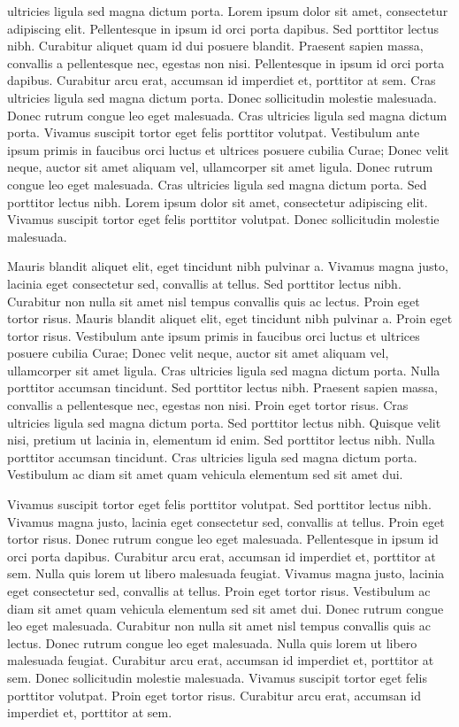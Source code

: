 \documentclass{article}
\begin{document}
\beginnumbering
\autopar
 ultricies ligula sed magna dictum porta. Lorem ipsum dolor sit amet, consectetur adipiscing elit. Pellentesque in ipsum id orci porta dapibus. Sed porttitor lectus nibh. Curabitur aliquet quam id dui posuere blandit. Praesent sapien massa, convallis a pellentesque nec, egestas non nisi. Pellentesque in ipsum id orci porta dapibus. Curabitur arcu erat, accumsan id imperdiet et, porttitor at sem. Cras ultricies ligula sed magna dictum porta. Donec sollicitudin molestie malesuada. Donec rutrum congue leo eget malesuada. Cras ultricies ligula sed magna dictum porta. Vivamus suscipit tortor eget felis porttitor volutpat. Vestibulum ante ipsum primis in faucibus orci luctus et ultrices posuere cubilia Curae; Donec velit neque, auctor sit amet aliquam vel, ullamcorper sit amet ligula. Donec rutrum congue leo eget malesuada. Cras ultricies ligula sed magna dictum porta. Sed porttitor lectus nibh. Lorem ipsum dolor sit amet, consectetur adipiscing elit. Vivamus suscipit tortor eget felis porttitor volutpat. Donec sollicitudin molestie malesuada.

Mauris blandit aliquet elit, eget tincidunt nibh pulvinar a. Vivamus magna justo, lacinia eget consectetur sed, convallis at tellus. Sed porttitor lectus nibh. Curabitur non nulla sit amet nisl tempus convallis quis ac lectus. Proin eget tortor risus. Mauris blandit aliquet elit, eget tincidunt nibh pulvinar a. Proin eget tortor risus. Vestibulum ante ipsum primis in faucibus orci luctus et ultrices posuere cubilia Curae; Donec velit neque, auctor sit amet aliquam vel, ullamcorper sit amet ligula. Cras ultricies ligula sed magna dictum porta. Nulla porttitor accumsan tincidunt. Sed porttitor lectus nibh. Praesent sapien massa, convallis a pellentesque nec, egestas non nisi. Proin eget tortor risus. Cras ultricies ligula sed magna dictum porta. Sed porttitor lectus nibh. Quisque velit nisi, pretium ut lacinia in, elementum id enim. Sed porttitor lectus nibh. Nulla porttitor accumsan tincidunt. Cras ultricies ligula sed magna dictum porta. Vestibulum ac diam sit amet quam vehicula elementum sed sit amet dui.

Vivamus suscipit tortor eget felis porttitor volutpat. Sed porttitor lectus nibh. Vivamus magna justo, lacinia eget consectetur sed, convallis at tellus. Proin eget tortor risus. Donec rutrum congue leo eget malesuada. Pellentesque in ipsum id orci porta dapibus. Curabitur arcu erat, accumsan id imperdiet et, porttitor at sem. Nulla quis lorem ut libero malesuada feugiat. Vivamus magna justo, lacinia eget consectetur sed, convallis at tellus. Proin eget tortor risus. Vestibulum ac diam sit amet quam vehicula elementum sed sit amet dui. Donec rutrum congue leo eget malesuada. Curabitur non nulla sit amet nisl tempus convallis quis ac lectus. Donec rutrum congue leo eget malesuada. Nulla quis lorem ut libero malesuada feugiat. Curabitur arcu erat, accumsan id imperdiet et, porttitor at sem. Donec sollicitudin molestie malesuada. Vivamus suscipit tortor eget felis porttitor volutpat. Proin eget tortor risus. Curabitur arcu erat, accumsan id imperdiet et, porttitor at sem.
\end{document}
